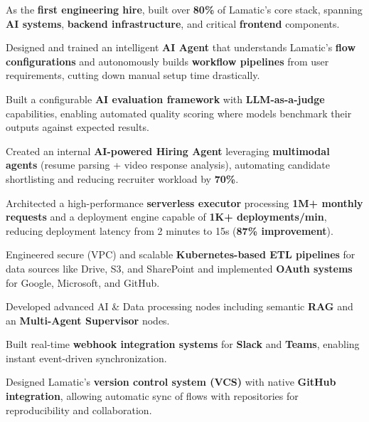 \documentclass[letterpaper,10pt]{article}
\newenvironment{resume_list}{
  \vspace{-7pt}
  \begin{itemize}[itemsep=-2px, parsep=1pt, leftmargin=30pt]
}{
  \end{itemize}
}
\begin{document}
\begin{resume_list}
\item As the \textbf{first engineering hire}, built over \textbf{80\%} of Lamatic’s core stack, spanning \textbf{AI systems}, \textbf{backend infrastructure}, and critical \textbf{frontend} components.  

\item Designed and trained an intelligent \textbf{AI Agent} that understands Lamatic’s \textbf{flow configurations} and autonomously builds \textbf{workflow pipelines} from user requirements, cutting down manual setup time drastically.  

\item Built a configurable \textbf{AI evaluation framework} with \textbf{LLM-as-a-judge} capabilities, enabling automated quality scoring where models benchmark their outputs against expected results.  

\item Created an internal \textbf{AI-powered Hiring Agent} leveraging \textbf{multimodal agents} (resume parsing + video response analysis), automating candidate shortlisting and reducing recruiter workload by \textbf{70\%}.  

\item Architected a high-performance \textbf{serverless executor} processing \textbf{1M+ monthly requests} and a deployment engine capable of \textbf{1K+ deployments/min}, reducing deployment latency from 2 minutes to 15s (\textbf{87\% improvement}).  

\item Engineered secure (VPC) and scalable \textbf{Kubernetes-based ETL pipelines} for data sources like Drive, S3, and SharePoint and implemented \textbf{OAuth systems} for Google, Microsoft, and GitHub.  

\item Developed advanced AI \& Data processing nodes including semantic \textbf{RAG} and an \textbf{Multi-Agent Supervisor} nodes.


\item Built real-time \textbf{webhook integration systems} for \textbf{Slack} and \textbf{Teams}, enabling instant event-driven synchronization.  

\item Designed Lamatic’s \textbf{version control system (VCS)} with native \textbf{GitHub integration}, allowing automatic sync of flows with repositories for reproducibility and collaboration.  
\end{resume_list}
\end{document}
